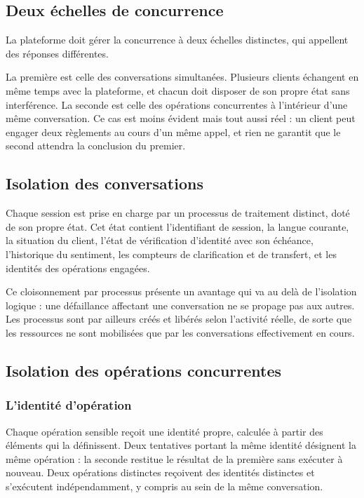\subsection{Deux échelles de concurrence}

La plateforme doit gérer la concurrence à deux échelles distinctes, qui appellent des réponses différentes.

La première est celle des conversations simultanées. Plusieurs clients échangent en même temps avec la plateforme, et chacun doit disposer de son propre état sans interférence. La seconde est celle des opérations concurrentes à l'intérieur d'une même conversation. Ce cas est moins évident mais tout aussi réel : un client peut engager deux règlements au cours d'un même appel, et rien ne garantit que le second attendra la conclusion du premier.

\subsection{Isolation des conversations}

Chaque session est prise en charge par un processus de traitement distinct, doté de son propre état. Cet état contient l'identifiant de session, la langue courante, la situation du client, l'état de vérification d'identité avec son échéance, l'historique du sentiment, les compteurs de clarification et de transfert, et les identités des opérations engagées.

Ce cloisonnement par processus présente un avantage qui va au delà de l'isolation logique : une défaillance affectant une conversation ne se propage pas aux autres. Les processus sont par ailleurs créés et libérés selon l'activité réelle, de sorte que les ressources ne sont mobilisées que par les conversations effectivement en cours.

\subsection{Isolation des opérations concurrentes}

\subsubsection{L'identité d'opération}

Chaque opération sensible reçoit une identité propre, calculée à partir des éléments qui la définissent. Deux tentatives portant la même identité désignent la même opération : la seconde restitue le résultat de la première sans exécuter à nouveau. Deux opérations distinctes reçoivent des identités distinctes et s'exécutent indépendamment, y compris au sein de la même conversation.


